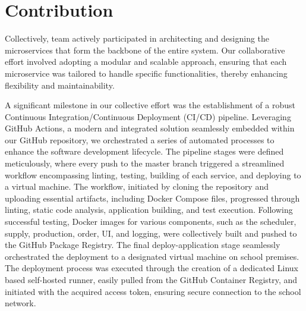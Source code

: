 \documentclass[conference, onecolumn]{IEEEtran}
\begin{document}


\maketitle
\IEEEpubidadjcol


\section{Contribution}
Collectively, team actively participated in architecting and designing the microservices that form the backbone of the entire system. Our collaborative effort involved adopting a modular and scalable approach, ensuring that each microservice was tailored to handle specific functionalities, thereby enhancing flexibility and maintainability.

A significant milestone in our collective effort was the establishment of a robust Continuous Integration/Continuous Deployment (CI/CD) pipeline. Leveraging GitHub Actions, a modern and integrated solution seamlessly embedded within our GitHub repository, we orchestrated a series of automated processes to enhance the software development lifecycle. The pipeline stages were defined meticulously, where every push to the master branch triggered a streamlined workflow encompassing linting, testing, building of each service, and deploying to a virtual machine. The workflow, initiated by cloning the repository and uploading essential artifacts, including Docker Compose files, progressed through linting, static code analysis, application building, and test execution. Following successful testing, Docker images for various components, such as the scheduler, supply, production, order, UI, and logging, were collectively built and pushed to the GitHub Package Registry. The final deploy-application stage seamlessly orchestrated the deployment to a designated virtual machine on school premises. The deployment process was executed through the creation of a dedicated Linux based self-hosted runner, easily pulled from the GitHub Container Registry, and initiated with the acquired access token, ensuring secure connection to the school network.
\end{document}
